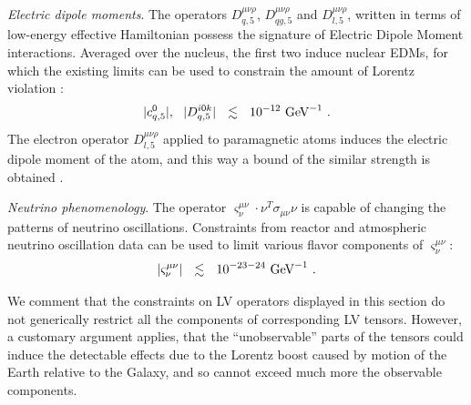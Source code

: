 \documentclass[12pt,preprintnumbers,nofootinbib]{revtex4}
\newcommand{\GeV}{{\rm GeV}}
\begin{document}
	

	{\it Electric dipole moments}. 
	The operators $ D_{q,5}^{\mu\nu\rho} $, $ D_{qg,5}^{\mu\nu\rho} $ and
	$ D_{l,5}^{\mu\nu\rho} $, written in terms of low-energy effective Hamiltonian
	possess the signature of Electric Dipole Moment interactions.
	Averaged over the nucleus, the first two induce nuclear EDMs, for which the 
	existing limits can be used to constrain the amount of Lorentz violation
\cite{Bolokhov:2006yx}:
\[
	|c_{q,5}^0|,~~ | D_{q,5}^{i0k} | ~~\lesssim~~ 10^{-12}~\GeV^{-1}~.
\]
	The electron operator $ D_{l,5}^{\mu\nu\rho} $ applied to paramagnetic atoms induces
	the electric dipole moment of the atom, and this way a bound of the similar strength
	is obtained
\cite{Bolokhov:2006yx}.

	{\it Neutrino phenomenology}.
	The operator $ \varsigma^{\mu\nu}_\nu \cdot \nu^T \sigma_{\mu\nu} \nu $ is capable
	of changing the patterns of neutrino oscillations.
	Constraints from reactor and atmospheric neutrino oscillation data can be used 
\cite{Choubey:2003ke}
	to limit various flavor components of $ \varsigma_\nu^{\mu\nu} $:
\[
	| \varsigma_\nu^{\mu\nu} | ~~\lesssim~~ 10^{-23-24}~\GeV^{-1}~.
\]

	We comment that the constraints on LV operators displayed in this section do not 
	generically restrict all the components of corresponding LV tensors.
	However, a customary argument applies, that the ``unobservable'' parts of the tensors
	could induce the detectable effects due to the Lorentz boost caused by motion of the Earth 
	relative to the Galaxy, and so cannot exceed much more the observable components.
	
\end{document}
